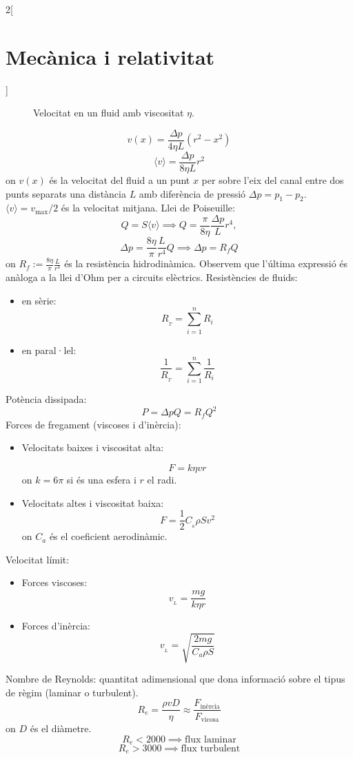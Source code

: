 \documentclass[class=article,10pt,crop=false]{standalone}
\begin{document}
\begin{multicols}{2}[\section{Mecànica i relativitat}]
\begin{figure}[ht]
    \caption{Velocitat en un fluid amb viscositat $\eta$.}
\end{figure}
$$v(x)=\frac{\Delta p}{4\eta L}(r^2-x^2)$$
$$\langle v\rangle=\frac{\Delta p}{8\eta L}r^2$$
{on $v(x)$ és la velocitat del fluid a un punt $x$ per sobre l'eix del canal entre dos punts separats una distància $L$ amb diferència de pressió $\Delta p=p_1-p_2$. $\langle v\rangle=v_{\text{max}}/2$ és la velocitat mitjana.}\newline
Llei de Poiseuille:
$$Q=S\langle v\rangle\implies Q=\frac{\pi}{8\eta}\frac{\Delta p}{L}r^4,$$ $$\Delta p=\frac{8\eta}{\pi}\frac{L}{r^4}Q\implies \Delta p=R_f Q$$
{on $R_f:=\frac{8\eta}{\pi}\frac{L}{r^4}$ és la resistència hidrodinàmica. Observem que l'última expressió és anàloga a la llei d'Ohm per a circuits elèctrics.} \newline
Resistències de fluids:
\begin{itemize}
    \item en sèrie: $$R_{\!_T}=\sum_{i=1}^nR_i$$
    \item en paral·lel: $$\frac{1}{R_{\!_T}}=\sum_{i=1}^n\frac{1}{R_i}$$
\end{itemize}
Potència dissipada: $$P=\Delta pQ=R_fQ^2$$
Forces de fregament (viscoses i d'inèrcia):
\begin{itemize}
    \item Velocitats baixes i viscositat alta:\par 
    $$F=k\eta vr$$
    {on $k=6\pi$ si és una esfera i $r$ el radi.}
    \item Velocitats altes i viscositat baixa:
    $$F=\frac{1}{2}C_{\!_a}\rho Sv^2$$
    {on $C_a$ és el coeficient aerodinàmic.}
\end{itemize}
Velocitat límit: \begin{itemize}
    \item Forces viscoses: $$v_{\!_L}=\frac{mg}{k\eta r}$$
    \item Forces d'inèrcia: $$v_{\!_L}=\sqrt{\frac{2mg}{C_a\rho S}}$$
\end{itemize}
Nombre de Reynolds: quantitat adimensional que dona informació sobre el tipus de règim (laminar o turbulent).
$$R_e=\frac{\rho vD}{\eta}\approx\frac{F_{\text{inèrcia}}}{F_{\text{vicosa}}}$$
{on $D$ és el diàmetre.}
$$R_e<2000\implies\text{flux laminar}$$
$$R_e>3000\implies\text{flux turbulent}$$
\end{multicols}
\end{document}
